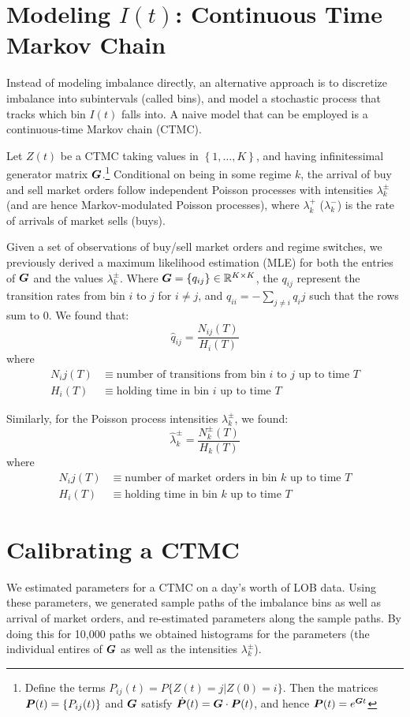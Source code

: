 \section{Modeling \texorpdfstring{$I(t)$}{I(t)}: Continuous Time Markov Chain}
Instead of modeling imbalance directly, an alternative approach is to discretize imbalance
into subintervals (called bins), and model a stochastic process that tracks which
bin $I(t)$ falls into. A naive model that can be employed is a continuous-time Markov chain (CTMC).

Let $Z(t)$ be a CTMC taking values in $\left\lbrace 1,\dots , K \right\rbrace$, and having
infinitessimal generator matrix $\boldsymbol{G}$.\footnote{Define the terms 
$P_{ij}(t) = P \lbrace Z(t) = j | Z(0) = i \rbrace$. Then the matrices 
$\boldsymbol{P}(t) = \lbrace P_{ij}(t) \rbrace$ and $\boldsymbol{G}$ satisfy
$\dot{\boldsymbol{P}}(t) = \boldsymbol{G} \cdot \boldsymbol{P}(t)$, and hence $\boldsymbol{P}(t) = e^{\boldsymbol{G}t}$} 
Conditional on being in some regime $k$, the arrival of buy and sell market orders follow
independent Poisson processes with intensities $\lambda_k^\pm$ (and are hence Markov-modulated
Poisson processes), where $\lambda_k^+$ ($\lambda_k^-$) is the rate of arrivals of market sells (buys).

Given a set of observations of buy/sell market orders and regime switches, we previously derived a
maximum likelihood estimation (MLE) for both the entries of $\boldsymbol{G}$ and the values $\lambda_k^\pm$. 
Where $\boldsymbol{G} = \lbrace q_{ij} \rbrace \in \mathbb{R}^{K \times K}$, the $q_{ij}$ represent the
transition rates from bin $i$ to $j$ for $i \neq j$, and $q_{ii} = - \sum_{j \neq i} q_ij$ such
that the rows sum to $0$. We found that:
$$ \hat{q}_{ij} = \dfrac{N_{ij}(T)}{H_i(T)} $$
where
\begin{align*} 
N_ij(T) & \equiv \text{number of transitions from bin $i$ to $j$ up to time $T$} \\
H_i(T) & \equiv \text{holding time in bin $i$ up to time $T$}
\end{align*}

Similarly, for the Poisson process intensities $\lambda_k^\pm$, we found:
$$ \hat{\lambda}_k^\pm = \dfrac{N_k^\pm(T)}{H_k(T)} $$
where
\begin{align*} 
N_ij(T) & \equiv \text{number of market orders in bin $k$ up to time $T$} \\
H_i(T) & \equiv \text{holding time in bin $k$ up to time $T$}
\end{align*}

\section{Calibrating a CTMC}
We estimated parameters for a CTMC on a day's worth of LOB data.
Using these parameters, we generated sample paths of the imbalance bins as well as arrival of market orders,
and re-estimated parameters along the sample paths. By doing this for 10,000 paths we obtained histograms for
the parameters (the individual entires of $\boldsymbol{G}$ as well as the intensities $\lambda_k^\pm$). 

